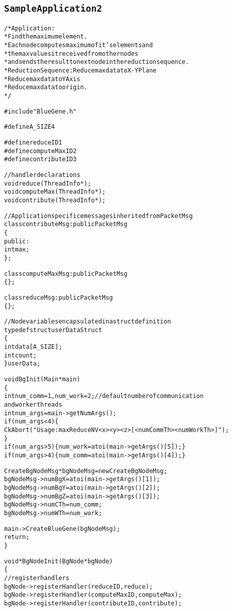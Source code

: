 \documentclass[10pt]{article}
\begin{document}
\begin{alltt}
\subsection{Sample Application 2}

/* Application: 
 *   Find the maximum element.
 *   Each node computes maximum of it's elements and
 *   the max values it received from other nodes
 *   and sends the result to next node in the reduction sequence.
 * Reduction Sequence: Reduce max data to X-Y Plane
 *   Reduce max data to Y Axis
 *   Reduce max data to origin.
 */

#include "BlueGene.h"

#define A_SIZE 4

#define reduceID                    1
#define computeMaxID        2
#define contributeID             3

//handler declarations
void reduce(ThreadInfo *) ;
void computeMax(ThreadInfo *) ;
void contribute(ThreadInfo *) ;

//Application specifice messages inherited from PacketMsg
class contributeMsg: public PacketMsg
\{
public:
  int max ;
\} ;

class computeMaxMsg: public PacketMsg
\{\} ;

class reduceMsg: public PacketMsg
\{\} ;

//Node variables encapsulated in a struct definition
typedef struct userDataStruct
\{
  int data[A_SIZE] ;
  int count ;
\} userData ;

void BgInit(Main *main)
\{
  int num_comm = 1, num_work = 2;       // default number of communication
and worker threads
  int num_args = main->getNumArgs();
  if (num_args < 4) \{ 
    CkAbort("Usage: maxReduceNV <x> <y> <z> [<numCommTh> <numWorkTh>]\n"); 
  \}
  if (num_args > 5) \{ num_work = atoi(main->getArgs()[5]); \}
  if (num_args > 4) \{ num_comm = atoi(main->getArgs()[4]); \}

  CreateBgNodeMsg *bgNodeMsg = new CreateBgNodeMsg;
  bgNodeMsg->numBgX = atoi(main->getArgs()[1]);
  bgNodeMsg->numBgY = atoi(main->getArgs()[2]);
  bgNodeMsg->numBgZ = atoi(main->getArgs()[3]);
  bgNodeMsg->numCTh = num_comm;
  bgNodeMsg->numWTh = num_work;

  main->CreateBlueGene(bgNodeMsg);
  return;
\}

void* BgNodeInit(BgNode *bgNode)
\{
  //register handlers
  bgNode->registerHandler(reduceID, reduce) ;
  bgNode->registerHandler(computeMaxID, computeMax) ;
  bgNode->registerHandler(contributeID, contribute) ;


\end{alltt}
\end{document}
